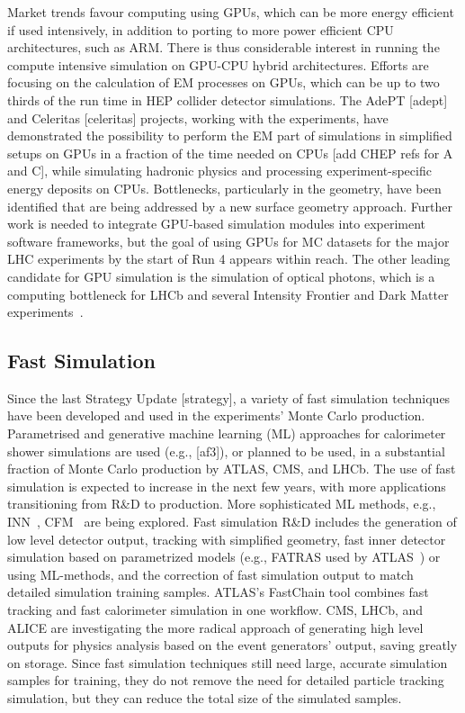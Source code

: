 \documentclass[10pt,a4paper]{article}
\begin{document}
Market trends favour computing using GPUs, which can be more energy efficient if
used intensively, in addition to porting to more power efficient CPU
architectures, such as ARM. There is thus considerable interest in running the
compute intensive simulation on GPU-CPU hybrid architectures. Efforts are
focusing on the calculation of EM processes on GPUs, which can be up to two
thirds of the run time in HEP collider detector simulations. The AdePT
{[}adept{]} and Celeritas {[}celeritas{]} projects, working with the
experiments, have demonstrated the possibility to perform the EM part of
simulations in simplified setups on GPUs in a fraction of the time needed on
CPUs {[}add CHEP refs for A and C{]}, while simulating hadronic physics and
processing experiment-specific energy deposits on CPUs. Bottlenecks,
particularly in the geometry, have been identified that are being addressed by a
new surface geometry approach. Further work is needed to integrate GPU-based
simulation modules into experiment software frameworks, but the goal of using
GPUs for MC datasets for the major LHC experiments by the start of Run 4 appears
within reach. The other leading candidate for GPU simulation is the simulation
of optical photons, which is a computing bottleneck for LHCb and several
Intensity Frontier and Dark Matter experiments~\cite{opticksCHEP}.

\subsection{Fast Simulation}\label{fast-simulation}

Since the last Strategy Update {[}strategy{]}, a variety of fast simulation
techniques have been developed and used in the experiments' Monte Carlo
production. Parametrised and generative machine learning (ML) approaches for
calorimeter shower simulations are used (e.g., {[}af3{]}), or planned to be
used, in a substantial fraction of Monte Carlo production by ATLAS, CMS, and
LHCb. The use of fast simulation is expected to increase in the next few years,
with more applications transitioning from R\&D to production. More sophisticated
ML methods, e.g., INN~\cite{kim2021innmethodidentifyingcleanannotated},
CFM~\cite{tong2024improvinggeneralizingflowbasedgenerative} are being explored.
Fast simulation R\&D includes the generation of low level detector output,
tracking with simplified geometry, fast inner detector simulation based on
parametrized models (e.g., FATRAS used by ATLAS~\cite{fatras}) or using
ML-methods, and the correction of fast simulation output to match detailed
simulation training samples. ATLAS's FastChain tool combines fast tracking and
fast calorimeter simulation in one workflow. CMS, LHCb, and ALICE are
investigating the more radical approach of generating high level outputs for
physics analysis based on the event generators' output, saving greatly on
storage. Since fast simulation techniques still need large, accurate simulation
samples for training, they do not remove the need for detailed particle tracking
simulation, but they can reduce the total size of the simulated samples.
\end{document}
